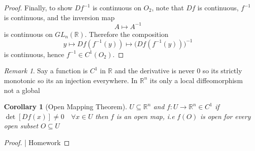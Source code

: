 \documentclass[11pt,openany]{book}
\theoremstyle{plain}
\newtheorem{corollary}{Corollary}[chapter]
\theoremstyle{definition}
\theoremstyle{remark}
\newtheorem{remark}{Remark}[chapter]
\newcommand{\R}{\mathbb{R}}
\begin{document}
\begin{proof}
Finally, to show $Df^{-1}$ is continuous on $O_2$, note that $Df$ is continuous, $f^{-1}$ is continuous, and the inversion map
\[
A\mapsto A^{-1}
\]
is continuous on $GL_n(\mathbb{R})$. Therefore the composition
\[
y\mapsto Df(f^{-1}(y)) \mapsto \bigl(Df(f^{-1}(y))\bigr)^{-1}
\]
is continuous, hence $f^{-1}\in C^1(O_2)$.
\end{proof}

\begin{remark}
Say a function is $C^1$ in $\R$ and the derivative is never $0$ so its strictly monotonic so its an injection everywhere. In $\R^n$ its only a local diffeomorphism not a global
\end{remark}

\begin{corollary}[Open Mapping Theorem]
    $U \subseteq \R^n$ and $f: U \to \R^n \in C^1$ if $\det[Df(x)] \ne 0 \quad \forall x \in U$ then $f$ is an open map, i.e $f(O)$ is open for every open subset $O \subseteq U$
\end{corollary}

\begin{proof}
    | Homework
\end{proof}
\end{document}
